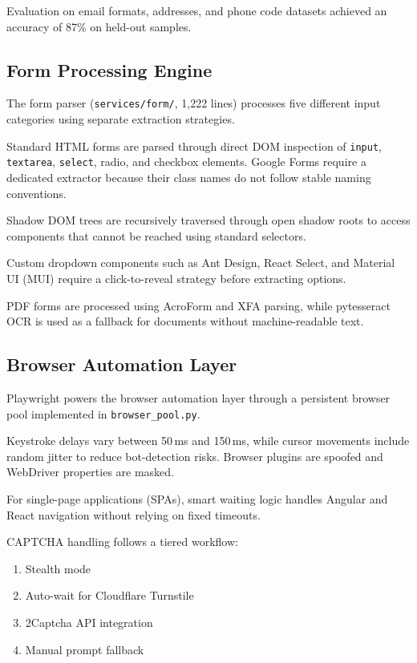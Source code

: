 \documentclass[conference]{IEEEtran}
\begin{document}
Evaluation on email formats, addresses, and phone code datasets achieved an
accuracy of 87\% on held-out samples.

\subsection{Form Processing Engine}

The form parser (\texttt{services/form/}, 1,222 lines) processes five different
input categories using separate extraction strategies.

Standard HTML forms are parsed through direct DOM inspection of
\texttt{input}, \texttt{textarea}, \texttt{select}, radio, and checkbox elements.
Google Forms require a dedicated extractor because their class names do not follow
stable naming conventions.

Shadow DOM trees are recursively traversed through open shadow roots to access
components that cannot be reached using standard selectors.

Custom dropdown components such as Ant Design, React Select, and Material UI (MUI)
require a click-to-reveal strategy before extracting options.

PDF forms are processed using AcroForm and XFA parsing, while pytesseract OCR is
used as a fallback for documents without machine-readable text.

\subsection{Browser Automation Layer}

Playwright powers the browser automation layer through a persistent browser pool
implemented in \texttt{browser\_pool.py}.

Keystroke delays vary between 50\,ms and 150\,ms, while cursor movements include
random jitter to reduce bot-detection risks. Browser plugins are spoofed and
WebDriver properties are masked.

For single-page applications (SPAs), smart waiting logic handles Angular and React
navigation without relying on fixed timeouts.

CAPTCHA handling follows a tiered workflow:
\begin{enumerate}
    \item Stealth mode
    \item Auto-wait for Cloudflare Turnstile
    \item 2Captcha API integration
    \item Manual prompt fallback
\end{enumerate}
\end{document}
